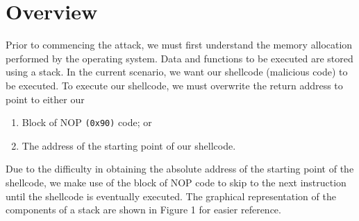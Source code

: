 \documentclass[a4paper,12pt]{article}
\begin{document}
	\section{Overview}
	Prior to commencing the attack, we must first understand the memory allocation performed by the operating system. Data and functions to be executed are stored using a stack. In the current scenario, we want our shellcode (malicious code) to be executed. To execute our shellcode, we must overwrite the return address to point to either our \begin{enumerate}
		\item Block of NOP \texttt{(0x90)} code; or
		\item The address of the starting point of our shellcode.
	\end{enumerate} Due to the difficulty in obtaining the absolute address of the starting point of the shellcode, we make use of the block of NOP code to skip to the next instruction until the shellcode is eventually executed. The graphical representation of the components of a stack are shown in Figure 1 for easier reference.
	\iffalse
	\begin{figure}[!h]
		\centering
		\begin{tikzpicture}
		\draw (-2,3) -- (-2,3.8);
		\draw (2,3) -- (2,3.8);
		\draw[fill=gray!40]  (-2,3)  rectangle node {Stack} (2,2.2);
		\draw (-2,2.2) rectangle (2,1.2);
		\draw[fill=gray!40]  (-2,1.2) rectangle node {Heap}(2,0.4);
		\draw (-2,0.4) rectangle node {BSS Segment} (2,-0.2);
		\draw (-2,-0.2) rectangle node {Data Segment} (2,-0.8);
		\draw (-2,-0.8) rectangle node {Text Segment} (2,-1.4);
		\draw(3.8,3) node[text width=3cm,align=left] {High Address} (3.8,-1.4) node[text width=3cm,align=left] {Low Address};
		\draw (-2,-1.4) -- (-2,-2.2);
		\draw (2,-1.4) -- (2,-2.2);
		\end{tikzpicture}
		\caption{Program Layout}
	\end{figure}
	\fi
\end{document}
